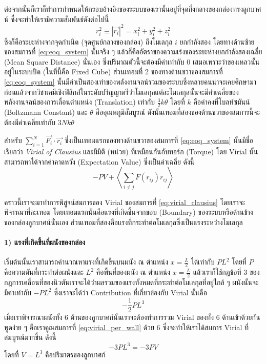 ต่อจากนั้นก็เราก็ทำการกำหนดให้กรอบอ้างอิงของระบบของเรานั้นอยู่ที่จุดกึ่งกลางของกล่องทรงลูกบาศน์ ซึ่งจะทำให้เรามีความสัมพันธ์ดังต่อไปนี้
%
\begin{equation}
    r_i^2\equiv \left| \vec{r_i}\right|^2
    =
    x_i^2+y_i^2+z_i^2
\end{equation}
%
ซึ่งก็คือระยะห่างจากจุดกำเนิด (จุดศูนย์กลางของกล่อง) ถึงโมเลกุล $i$ ยกกำลังสอง โดยทางด้านซ้ายของสมการที่ \eqref{eq:eoq_system} นั้นจริง ๆ แล้วก็คืออัตราของความเร่งของระยะห่างยกกำลังสองเฉลี่ย (Mean Square Distance) นั่นเอง ซึ่งปริมาณตัวนี้จะต้องมีค่าเท่ากับ 0 เสมอเพราะว่าของเหลวนั้นอยู่ในระบบปิด (ในที่นี้คือ Fixed Cube) ส่วนเทอมที่ 2 ของทางด้านขวาของสมการที่ \eqref{eq:eoq_system} นั้นมีค่าเป็นสองเท่าของพลังงานจลน์รวมของระบบซึ่งหลายคนน่าจะเคยศึกษามาก่อนแล้วจากวิชาเคมีเชิงฟิสิกส์ในระดับปริญญาตรีว่าโมเลกุลแต่ละโมเลกุลนั้นจะมีค่าเฉลี่ยของพลังงานจลน์ของการเลื่อนตำแหน่ง (Translation) เท่ากับ $\frac 32k\theta$ โดยที่ $k$ คือค่าคงที่โบลท์ซมันน์ (Boltzmann Constant) และ $\theta$ คืออุณหภูมิสัมบูรณ์ ดังนั้นเทอมที่สองของด้านขวาของสมการนี้จะ%
ต้องมีค่าเฉลี่ยเท่ากับ $3Nk\theta$

สำหรับ $\sum_{i=1}^{N} \vec{F_i}\cdot \vec{r_i}$ ซึ่งเป็นเทอมแรกของทางด้านขวาของสมการที่ \eqref{eq:eoq_system} นั้นมีชื่อเรียกว่า \emph{Virial of Clausius} และมีมิติ (หน่วย) ที่เหมือนกันกับทอร์ก (Torque) โดย Virial นั้นสามารถหาได้จากค่าคาดหวัง (Expectation Value) ซึ่งเป็นค่าเฉลี่ย ดังนี้
%
\begin{equation}
    \label{eq:virial_clausius}
    -PV + \left\langle \sum_{i\neq j}F(r_{ij})r_{ij}\right\rangle
\end{equation}

คราวนี้เราจะมาทำการพิสูจน์สมการของ Virial ของสมการที่ \eqref{eq:virial_clausius} โดยเราจะพิจารณาที่ละเทอม โดยเทอมแรกนั้นคือแรงที่เกิดขึ้นจากขอบ (Boundary) ของระบบหรือด้านข้างของกล่องลูกบาศน์นั่นเอง ส่วนเทอมที่สองคือแรงที่กระทำต่อโมเลกุลซึ่งเป็นแรงระหว่างโมเลกุล

\paragraph{1) แรงที่เกิดขึ้นที่ผนังของกล่อง} เริ่มต้นนั้นเราสามารถคำนวณหาแรงที่เกิดขึ้นบนผนัง ณ ตำแหน่ง $x=\frac L2$ ได้เท่ากับ $PL^2$ โดยที่ $P$ คือความดันที่กระทำต่อผนังและ $L^2$ คือพื้นที่ของผนัง ณ ตำแหน่ง $x=\frac L2$ แล้วเราก็ใช้กฎข้อที่ 3 ของกฎการเคลื่อนที่ของนิวตันเราจะได้ว่าผลรวมของแรงทั้งหมดที่กระทำต่อโมเลกุลที่อยู่ใกล้ ๆ ผนังนั้นจะมีค่าเท่ากับ  $-PL^2$ ซึ่งเราจะได้ว่า Contribution ที่เกี่ยวข้องกับ Virial นั้นคือ
%
\begin{equation}
    \label{eq:virial_per_wall}
    -\frac 12PL^3
\end{equation}
%
เมื่อเราพิจารณาผนังทั้ง 6 ด้านของลูกบาศก์นั้นเราจะต้องทำการรวม Virial ของทั้ง 6 ด้านเข้าด้วยกัน พูดง่าย ๆ คือเราคูณสมการที่
\eqref{eq:virial_per_wall} ด้วย 6 ซึ่งจะทำให้เราได้สมการ Virial ที่สมบูรณ์มากขึ้น ดังนี้
%
\begin{equation}
    -3PL^3 
    = 
    -3PV
\end{equation}
%
โดยที่ $V=L^3$ คือปริมาตรของลูกบาศก์

